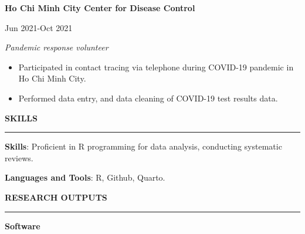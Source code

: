 \documentclass[
  16,
]{article}
\providecommand{\tightlist}{%
  \setlength{\itemsep}{0pt}\setlength{\parskip}{0pt}}\usepackage{longtable,booktabs,array}
\begin{document}
\vspace{3pt}

\begin{large}
\begin{multicols}{2}
\begin{flushleft}{\bf Ho Chi Minh City Center for Disease Control}\end{flushleft}
\begin{flushright}Jun 2021-Oct 2021\end{flushright}
\end{multicols}
\vspace{-0.17cm}
\begin{multicols}{2}
\begin{flushleft}\textit{Pandemic response volunteer}\end{flushleft}
\end{multicols}
\end{large}

\begin{itemize}
\tightlist
\item
  Participated in contact tracing via telephone during COVID-19 pandemic
  in Ho Chi Minh City.
\item
  Performed data entry, and data cleaning of COVID-19 test results data.
\end{itemize}

\vspace{0.05cm}

\begin{large}{\bf SKILLS}
  \vspace{3pt}
  \hrule
\end{large}

\textbf{Skills}: Proficient in R programming for data analysis,
conducting systematic reviews.

\vspace{-0.16cm}

\textbf{Languages and Tools}: R, Github, Quarto.

\vspace{0.05cm}

\begin{large}{\bf RESEARCH OUTPUTS}
\vspace{3pt}
\hrule
\begin{multicols}{2}
\begin{flushleft}{\bf Software}\end{flushleft}
\end{multicols}
\end{large}
\end{document}
